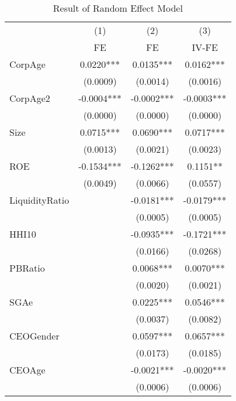 \begin{table}[htbp]\centering
\def\sym#1{\ifmmode^{#1}\else\(^{#1}\)\fi}
\caption{Result of Random Effect Model \label{tab:regressionRE}}
\begin{tabular}{l*{3}{c}}
\hline\hline
            &\multicolumn{1}{c}{(1)}&\multicolumn{1}{c}{(2)}&\multicolumn{1}{c}{(3)}\\
            &\multicolumn{1}{c}{FE}&\multicolumn{1}{c}{FE}&\multicolumn{1}{c}{IV-FE}\\
\hline
CorpAge     &      0.0220***&      0.0135***&      0.0162***\\
            &    (0.0009)   &    (0.0014)   &    (0.0016)   \\
[1em]
CorpAge2    &     -0.0004***&     -0.0002***&     -0.0003***\\
            &    (0.0000)   &    (0.0000)   &    (0.0000)   \\
[1em]
Size        &      0.0715***&      0.0690***&      0.0717***\\
            &    (0.0013)   &    (0.0021)   &    (0.0023)   \\
[1em]
ROE         &     -0.1534***&     -0.1262***&      0.1151** \\
            &    (0.0049)   &    (0.0066)   &    (0.0557)   \\
[1em]
LiquidityRatio&               &     -0.0181***&     -0.0179***\\
            &               &    (0.0005)   &    (0.0005)   \\
[1em]
HHI10       &               &     -0.0935***&     -0.1721***\\
            &               &    (0.0166)   &    (0.0268)   \\
[1em]
PBRatio     &               &      0.0068***&      0.0070***\\
            &               &    (0.0020)   &    (0.0021)   \\
[1em]
SGAe        &               &      0.0225***&      0.0546***\\
            &               &    (0.0037)   &    (0.0082)   \\
[1em]
CEOGender   &               &      0.0597***&      0.0657***\\
            &               &    (0.0173)   &    (0.0185)   \\
[1em]
CEOAge      &               &     -0.0021***&     -0.0020***\\
            &               &    (0.0006)   &    (0.0006)   \\

\end{tabular}
\end{table}
